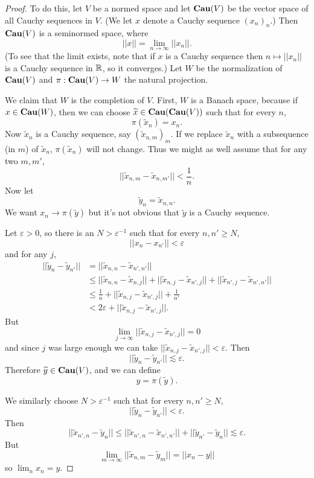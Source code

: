 \begin{proof}
To do this, let $V$ be a normed space and let $\mathbf{Cau} (V)$ be the vector space of all Cauchy sequences in $V$.
(We let $x$ denote a Cauchy sequence $(x_n)_n$.)
Then $\mathbf{Cau} (V)$ is a seminormed space, where
$$||x|| = \lim_{n \to \infty} ||x_n||.$$
(To see that the limit exists, note that if $x$ is a Cauchy sequence then $n \mapsto ||x_n||$ is a Cauchy sequence in $\mathbb{R}$, so it converges.)
Let $W$ be the normalization of $\mathbf{Cau} (V)$ and $\pi: \mathbf{Cau} (V) \to W$ the natural projection.

We claim that $W$ is the completion of $V$.
First, $W$ is a Banach space, because if $x \in \mathbf{Cau} (W)$, then we can choose $\widetilde x \in \mathbf{Cau} (\mathbf{Cau} (V))$ such that for every $n$,
$$\pi(\widetilde x_n) = x_n.$$
Now $\widetilde x_n$ is a Cauchy sequence, say $(\widetilde x_{n,m})_m$. If we replace $\widetilde x_n$ with a subsequence (in $m$) of $\widetilde x_n$, $\pi(\widetilde x_n)$ will not change.
Thus we might as well assume that for any two $m,m'$,
$$||\widetilde x_{n,m} - \widetilde x_{n,m'}|| < \frac{1}{n}.$$
Now let
$$\widetilde y_n = \widetilde x_{n,n}.$$
We want $x_n \to \pi(\widetilde y)$ but it's not obvious that $\widetilde y$ is a Cauchy sequence.

Let $\varepsilon > 0$, so there is an $N > \varepsilon^{-1}$ such that for every $n, n' \geq N$,
$$||x_n - x_{n'}|| < \varepsilon$$
and for any $j$,
\begin{align*}
  ||\widetilde y_n - \widetilde y_{n'}|| &= ||\widetilde x_{n,n} - \widetilde x_{n',n'}||\\
  &\leq ||\widetilde x_{n,n} - \widetilde x_{n,j}|| + ||\widetilde x_{n,j} - \widetilde x_{n',j}|| + ||\widetilde x_{n',j} - \widetilde x_{n',n'}||\\
  &\leq \frac{1}{n} + ||\widetilde x_{n,j} - \widetilde x_{n',j}|| + \frac{1}{n'}\\
  &< 2\varepsilon + ||\widetilde x_{n,j} - \widetilde x_{n',j}||.
\end{align*}
But
$$\lim_{j \to \infty} ||\widetilde x_{n,j} - \widetilde x_{n',j}|| = 0$$
and since $j$ was large enough we can take $||\widetilde x_{n,j} - \widetilde x_{n',j}|| < \varepsilon$. Then
$$||\widetilde y_n - \widetilde y_{n'}|| \lesssim \varepsilon.$$
Therefore $\widetilde y \in \mathbf{Cau} (V)$, and we can define
$$y = \pi(\widetilde y).$$

We similarly choose $N > \varepsilon^{-1}$ such that for every $n, n' \geq N$,
$$||\widetilde y_n - \widetilde y_{n'}|| < \varepsilon.$$
Then
$$||\widetilde x_{n',n} - \widetilde y_n|| \leq ||\widetilde x_{n',n} - \widetilde x_{n',n'}|| + ||\widetilde y_{n'} - \widetilde y_n|| \lesssim \varepsilon.$$
But
$$\lim_{m \to \infty} ||\widetilde x_{n,m} - \widetilde y_m|| = ||x_n - y||$$
so $\lim_n x_n = y$.


\end{proof}
